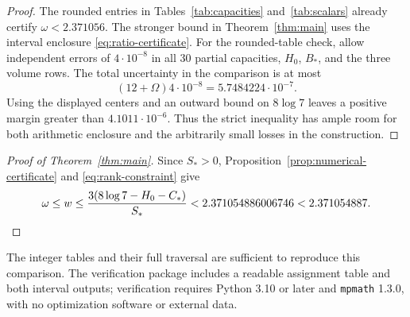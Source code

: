 \begin{proof}
The rounded entries in Tables~\ref{tab:capacities} and~\ref{tab:scalars}
already certify $\omega<2.371056$.  The stronger bound in
Theorem~\ref{thm:main} uses the interval enclosure
\eqref{eq:ratio-certificate}.
For the rounded-table check, allow independent errors of $4\cdot10^{-8}$ in all 30 partial capacities, $H_0$, $B_*$, and the three
volume rows. The total uncertainty in the comparison is at most
\[
 \left(12+\Omega\right)4\cdot10^{-8}=5.7484224\cdot10^{-7}.
\]
Using the displayed centers and an outward bound on $8\log7$ leaves a
positive margin greater than $4.1011\cdot10^{-6}$. Thus the strict inequality
has ample room for both arithmetic enclosure and the arbitrarily small
losses in the construction.
\end{proof}

\begin{proof}[Proof of Theorem~\ref{thm:main}]
Since $S_*>0$, Proposition~\ref{prop:numerical-certificate} and
\eqref{eq:rank-constraint} give
\[
 \omega\le w\le\frac{3(8\log7-H_0-C_*)}{S_*}
 <2.371054886006746<2.371054887.\qedhere
\]
\end{proof}
The integer tables and their full traversal are sufficient to reproduce this
comparison. The verification package includes a readable assignment table and both
interval outputs; verification requires Python 3.10 or later and
\texttt{mpmath} 1.3.0, with no optimization software or external data.
